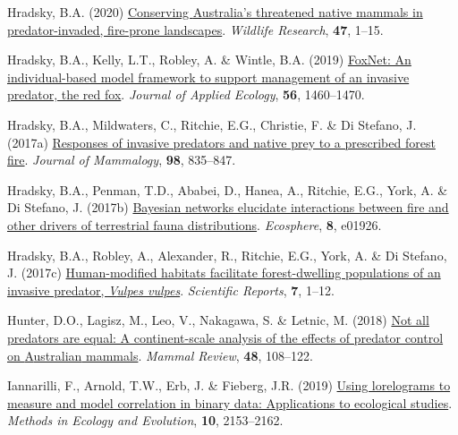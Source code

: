 \documentclass[11pt,a4paper,titlepage,twoside,openright]{style/unimelbthesis}
\newenvironment{CSLReferences}%
  {}%
  {\par}
\begin{document}
\begin{mainmatter}
\begin{CSLReferences}{1}{0}
\leavevmode{}%
Hradsky, B.A. (2020) \href{https://doi.org/10.1071/WR19027}{Conserving {A}ustralia's threatened native mammals in predator-invaded, fire-prone landscapes}. \emph{Wildlife Research}, \textbf{47}, 1--15.

\leavevmode{}%
Hradsky, B.A., Kelly, L.T., Robley, A. \& Wintle, B.A. (2019) \href{https://doi.org/10.1111/1365-2664.13374}{FoxNet: An individual-based model framework to support management of an invasive predator, the red fox}. \emph{Journal of Applied Ecology}, \textbf{56}, 1460--1470.

\leavevmode{}%
Hradsky, B.A., Mildwaters, C., Ritchie, E.G., Christie, F. \& Di Stefano, J. (2017a) \href{https://doi.org/10.1093/jmammal/gyx010}{{Responses of invasive predators and native prey to a prescribed forest fire}}. \emph{Journal of Mammalogy}, \textbf{98}, 835--847.

\leavevmode{}%
Hradsky, B.A., Penman, T.D., Ababei, D., Hanea, A., Ritchie, E.G., York, A. \& Di Stefano, J. (2017b) \href{https://esajournals.onlinelibrary.wiley.com/doi/abs/10.1002/ecs2.1926}{Bayesian networks elucidate interactions between fire and other drivers of terrestrial fauna distributions}. \emph{Ecosphere}, \textbf{8}, e01926.

\leavevmode{}%
Hradsky, B.A., Robley, A., Alexander, R., Ritchie, E.G., York, A. \& Di Stefano, J. (2017c) \href{https://doi.org/10.1038/s41598-017-12464-7}{Human-modified habitats facilitate forest-dwelling populations of an invasive predator, \emph{{V}ulpes vulpes}}. \emph{Scientific Reports}, \textbf{7}, 1--12.

\leavevmode{}%
Hunter, D.O., Lagisz, M., Leo, V., Nakagawa, S. \& Letnic, M. (2018) \href{https://doi.org/10.1111/mam.12115}{Not all predators are equal: A continent-scale analysis of the effects of predator control on {{A}ustralian} mammals}. \emph{Mammal Review}, \textbf{48}, 108--122.

\leavevmode{}%
Iannarilli, F., Arnold, T.W., Erb, J. \& Fieberg, J.R. (2019) \href{https://doi.org/10.1111/2041-210X.13308}{Using lorelograms to measure and model correlation in binary data: Applications to ecological studies}. \emph{Methods in Ecology and Evolution}, \textbf{10}, 2153--2162.


\end{CSLReferences}
\end{mainmatter}
\end{document}
